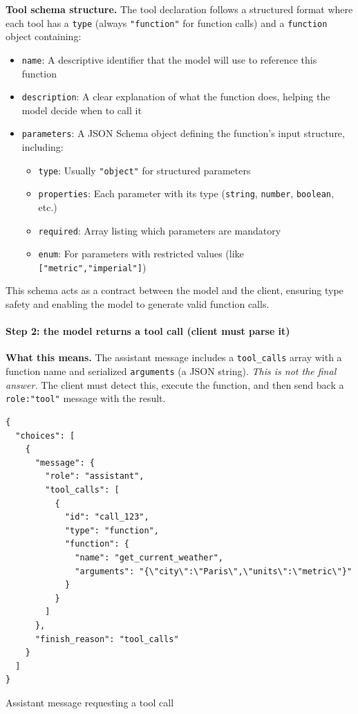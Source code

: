 \documentclass[english]{article}
\begin{document}
\noindent\textbf{Tool schema structure.}
The tool declaration follows a structured format where each tool has a \texttt{type} (always \texttt{"function"} for function calls) and a \texttt{function} object containing:
\begin{itemize}
  \item \texttt{name}: A descriptive identifier that the model will use to reference this function
  \item \texttt{description}: A clear explanation of what the function does, helping the model decide when to call it
  \item \texttt{parameters}: A JSON Schema object defining the function's input structure, including:
    \begin{itemize}
      \item \texttt{type}: Usually \texttt{"object"} for structured parameters
      \item \texttt{properties}: Each parameter with its type (\texttt{string}, \texttt{number}, \texttt{boolean}, etc.)
      \item \texttt{required}: Array listing which parameters are mandatory
      \item \texttt{enum}: For parameters with restricted values (like \texttt{["metric","imperial"]})
    \end{itemize}
\end{itemize}
This schema acts as a contract between the model and the client, ensuring type safety and enabling the model to generate valid function calls.

\paragraph{Step 2: the model returns a tool call (client must parse it)}

\noindent\textbf{What this means.}
The assistant message includes a \texttt{tool\_calls} array with a function name and serialized \texttt{arguments} (a JSON string). \emph{This is not the final answer.} The client must detect this, execute the function, and then send back a \texttt{role:"tool"} message with the result.

\begin{listing}[H]
\begin{verbatim}
{
  "choices": [
    {
      "message": {
        "role": "assistant",
        "tool_calls": [
          {
            "id": "call_123",
            "type": "function",
            "function": {
              "name": "get_current_weather",
              "arguments": "{\"city\":\"Paris\",\"units\":\"metric\"}"
            }
          }
        ]
      },
      "finish_reason": "tool_calls"
    }
  ]
}
\end{verbatim}
\caption{Assistant message requesting a tool call}
\end{listing}
\end{document}
